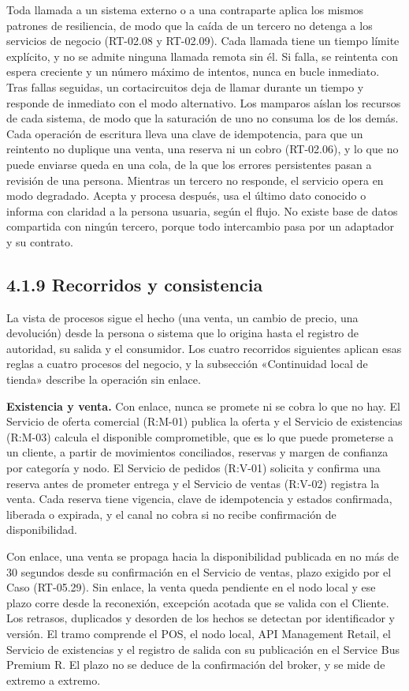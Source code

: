 \documentclass[11pt]{article}
\begin{document}
Toda llamada a un sistema externo o a una contraparte aplica los mismos patrones de resiliencia, de modo que la caída de un tercero no detenga a los servicios de negocio (RT-02.08 y RT-02.09). Cada llamada tiene un tiempo límite explícito, y no se admite ninguna llamada remota sin él. Si falla, se reintenta con espera creciente y un número máximo de intentos, nunca en bucle inmediato. Tras fallas seguidas, un cortacircuitos deja de llamar durante un tiempo y responde de inmediato con el modo alternativo. Los mamparos aíslan los recursos de cada sistema, de modo que la saturación de uno no consuma los de los demás. Cada operación de escritura lleva una clave de idempotencia, para que un reintento no duplique una venta, una reserva ni un cobro (RT-02.06), y lo que no puede enviarse queda en una cola, de la que los errores persistentes pasan a revisión de una persona. Mientras un tercero no responde, el servicio opera en modo degradado. Acepta y procesa después, usa el último dato conocido o informa con claridad a la persona usuaria, según el flujo. No existe base de datos compartida con ningún tercero, porque todo intercambio pasa por un adaptador y su contrato.

\subsection{4.1.9 Recorridos y consistencia}

La vista de procesos sigue el hecho (una venta, un cambio de precio, una devolución) desde la persona o sistema que lo origina hasta el registro de autoridad, su salida y el consumidor. Los cuatro recorridos siguientes aplican esas reglas a cuatro procesos del negocio, y la subsección «Continuidad local de tienda» describe la operación sin enlace.

\textbf{Existencia y venta.} Con enlace, nunca se promete ni se cobra lo que no hay. El Servicio de oferta comercial (R:M-01) publica la oferta y el Servicio de existencias (R:M-03) calcula el disponible comprometible, que es lo que puede prometerse a un cliente, a partir de movimientos conciliados, reservas y margen de confianza por categoría y nodo. El Servicio de pedidos (R:V-01) solicita y confirma una reserva antes de prometer entrega y el Servicio de ventas (R:V-02) registra la venta. Cada reserva tiene vigencia, clave de idempotencia y estados confirmada, liberada o expirada, y el canal no cobra si no recibe confirmación de disponibilidad.

Con enlace, una venta se propaga hacia la disponibilidad publicada en no más de 30 segundos desde su confirmación en el Servicio de ventas, plazo exigido por el Caso (RT-05.29). Sin enlace, la venta queda pendiente en el nodo local y ese plazo corre desde la reconexión, excepción acotada que se valida con el Cliente. Los retrasos, duplicados y desorden de los hechos se detectan por identificador y versión. El tramo comprende el POS, el nodo local, API Management Retail, el Servicio de existencias y el registro de salida con su publicación en el Service Bus Premium R. El plazo no se deduce de la confirmación del broker, y se mide de extremo a extremo.
\end{document}
